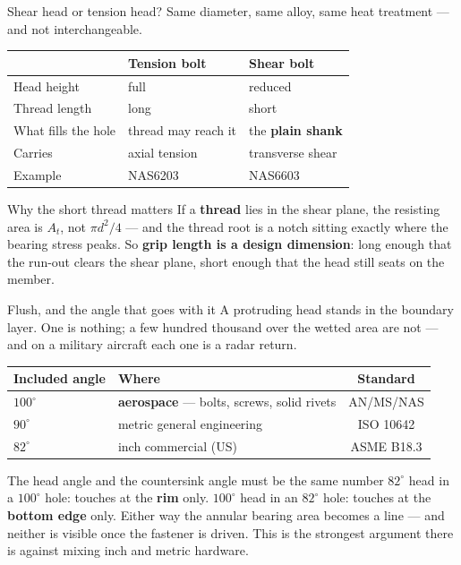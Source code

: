 \documentclass[aspectratio=169,10pt]{beamer}
\begin{document}
\begin{frame}{Shear head or tension head?}
Same diameter, same alloy, same heat treatment --- and \alert{not interchangeable}.
\vfill
\centering\small
\begin{tabular}{@{}lll@{}}
\toprule
 & \textbf{Tension bolt} & \textbf{Shear bolt}\\
\midrule
Head height & full & reduced\\
Thread length & long & short\\
What fills the hole & thread may reach it & the \textbf{plain shank}\\
Carries & axial tension & transverse shear\\
Example & NAS6203 & NAS6603\\
\bottomrule
\end{tabular}
\vfill
\raggedright
\begin{alertblock}{Why the short thread matters}
If a \textbf{thread} lies in the shear plane, the resisting area is $A_t$, not $\pi d^2/4$ --- and the
thread root is a notch sitting exactly where the bearing stress peaks.
\vspace{2pt}
So \textbf{grip length is a design dimension}: long enough that the run-out clears the shear plane,
short enough that the head still seats on the member.
\end{alertblock}
\end{frame}

\begin{frame}{Flush, and the angle that goes with it}
A protruding head stands in the boundary layer. One is nothing; a few hundred thousand over the
wetted area are not --- and on a military aircraft each one is a radar return.
\vfill
\centering\small
\begin{tabular}{@{}llc@{}}
\toprule
Included angle & Where & Standard\\
\midrule
\textbf{$100^\circ$} & \textbf{aerospace} --- bolts, screws, solid rivets & AN/MS/NAS\\
$90^\circ$ & metric general engineering & ISO 10642\\
$82^\circ$ & inch commercial (US) & ASME B18.3\\
\bottomrule
\end{tabular}
\vfill
\raggedright
\begin{alertblock}{The head angle and the countersink angle must be the same number}
$82^\circ$ head in a $100^\circ$ hole: touches at the \textbf{rim} only.
$100^\circ$ head in an $82^\circ$ hole: touches at the \textbf{bottom edge} only.
\vspace{2pt}
Either way the annular bearing area becomes a line --- and neither is visible once the fastener is
driven. This is the strongest argument there is against mixing inch and metric hardware.
\end{alertblock}
\end{frame}
\end{document}

